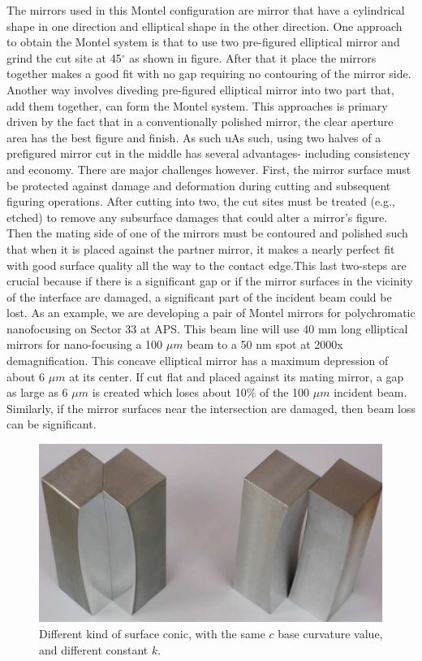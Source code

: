 The mirrors used in this Montel configuration are mirror that have a cylindrical shape in one direction and elliptical shape in the other direction. One approach to obtain the Montel system is that to use two pre-figured elliptical mirror and grind the cut site at 45$^\circ $ as shown in figure. After that it place the mirrors together makes a good fit with no gap requiring no contouring of the mirror side. Another way involves diveding pre-figured elliptical mirror into two part that, add them together, can form the Montel system. This approaches is primary driven by the fact that in a conventionally polished mirror, the clear aperture area has the best figure and finish. As such uAs such, using two halves of a prefigured mirror cut in the middle has several advantages- including consistency and economy. There are major challenges
however. First, the mirror surface must be protected against damage and deformation during cutting and subsequent figuring operations. After cutting into two, the cut sites must be treated (e.g., etched) to remove any subsurface damages that could alter a mirror's figure. Then the mating side of one of the mirrors must be contoured and polished such that when it is placed against the partner mirror, it makes a nearly perfect fit with good surface quality all the way to the contact edge.This last two-steps are crucial because if there is a significant gap or if the mirror surfaces in the vicinity of the interface are damaged, a significant part of the incident beam could be lost. As an example, we are developing a pair of Montel mirrors for polychromatic nanofocusing on Sector 33 at APS. This beam line will use 40 mm long elliptical mirrors for nano-focusing a 100 $\mu m$ beam to a 50 nm spot at 2000x demagnification. This concave elliptical mirror has a maximum depression of about 6 $\mu m$ at its center. If cut flat and placed against its mating mirror, a gap as large as 6 $\mu m$ is created which loses about 10$\% $ of the 100 $\mu m$ incident beam. Similarly, if the mirror surfaces near the intersection are damaged, then beam loss can be significant.
\begin{figure}[]
%
\centering
%
\includegraphics[width=.8\textwidth]{Immagini/Chapter2/MontelEdges}
%
\caption{Different kind of surface conic, with the same $c $ base curvature value, and different constant $k $.}
%
\label{fig: MontelEdges}
%
\end{figure}
